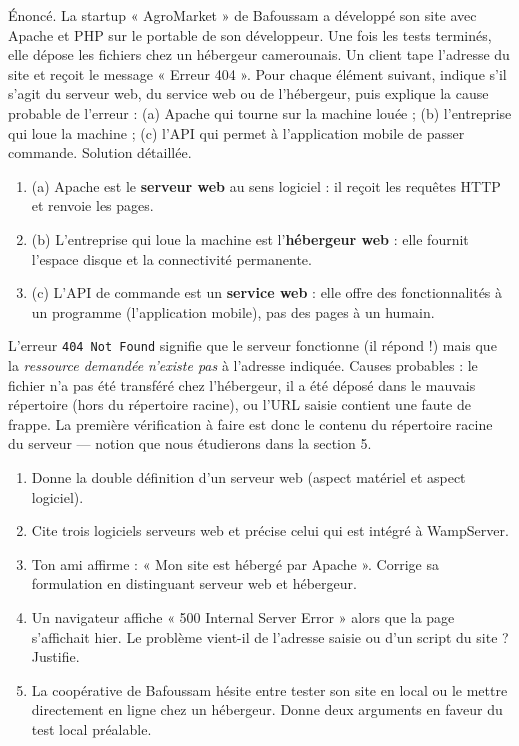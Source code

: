 \documentclass[11pt]{article}
\begin{document}
\begin{exoresolu}
Énoncé. La startup « AgroMarket » de Bafoussam a développé son site avec Apache et PHP sur le portable de son développeur. Une fois les tests terminés, elle dépose les fichiers chez un hébergeur camerounais. Un client tape l'adresse du site et reçoit le message « Erreur 404 ». Pour chaque élément suivant, indique s'il s'agit du serveur web, du service web ou de l'hébergeur, puis explique la cause probable de l'erreur : (a) Apache qui tourne sur la machine louée ; (b) l'entreprise qui loue la machine ; (c) l'API qui permet à l'application mobile de passer commande.
\tcblower
Solution détaillée.
\begin{enumerate}
\item (a) Apache est le \textbf{serveur web} au sens logiciel : il reçoit les requêtes HTTP et renvoie les pages.
\item (b) L'entreprise qui loue la machine est l'\textbf{hébergeur web} : elle fournit l'espace disque et la connectivité permanente.
\item (c) L'API de commande est un \textbf{service web} : elle offre des fonctionnalités à un programme (l'application mobile), pas des pages à un humain.
\end{enumerate}
L'erreur \texttt{404 Not Found} signifie que le serveur fonctionne (il répond !) mais que la \emph{ressource demandée n'existe pas} à l'adresse indiquée. Causes probables : le fichier n'a pas été transféré chez l'hébergeur, il a été déposé dans le mauvais répertoire (hors du répertoire racine), ou l'URL saisie contient une faute de frappe. La première vérification à faire est donc le contenu du répertoire racine du serveur — notion que nous étudierons dans la section 5.
\end{exoresolu}

\begin{exercice}
\begin{enumerate}
\item Donne la double définition d'un serveur web (aspect matériel et aspect logiciel).
\item Cite trois logiciels serveurs web et précise celui qui est intégré à WampServer.
\item Ton ami affirme : « Mon site est hébergé par Apache ». Corrige sa formulation en distinguant serveur web et hébergeur.
\item Un navigateur affiche « 500 Internal Server Error » alors que la page s'affichait hier. Le problème vient-il de l'adresse saisie ou d'un script du site ? Justifie.
\item La coopérative de Bafoussam hésite entre tester son site en local ou le mettre directement en ligne chez un hébergeur. Donne deux arguments en faveur du test local préalable.
\end{enumerate}
\end{exercice}
\end{document}
